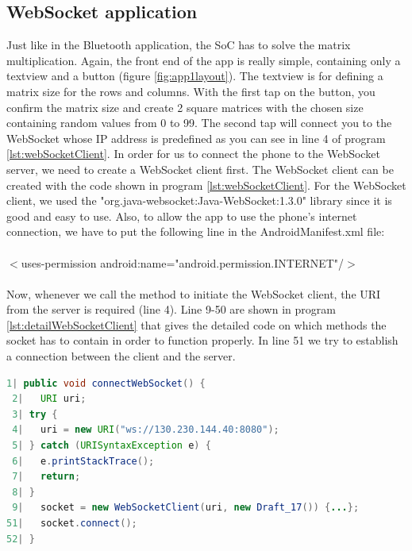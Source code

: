 \documentclass[a4paper, 11pt]{report}
\begin{document}
	\subsection{WebSocket application}\label{subsec:webapp}
Just like in the Bluetooth application, the SoC has to solve the matrix multiplication. Again, the front end of the app is really simple, containing only a textview and a button (figure \ref{fig:app1layout}). The textview is for defining a matrix size for the rows and columns. With the first tap on the button, you confirm the matrix size and create 2 square matrices with the chosen size containing random values from 0 to 99. The second tap will connect you to the WebSocket whose IP address is predefined as you can see in line 4 of program \ref{lst:webSocketClient}. In order for us to connect the phone to the WebSocket server, we need to create a WebSocket client first. The WebSocket client can be created with the code shown in program \ref{lst:webSocketClient}. For the WebSocket client, we used the "org.java-websocket:Java-WebSocket:1.3.0" library since it is good and easy to use. Also, to allow the app to use the phone's internet connection, we have to put the following line in the AndroidManifest.xml file:\\\\
\indent $<$uses-permission android:name="android.permission.INTERNET"/$>$
\\\\
Now, whenever we call the method to initiate the WebSocket client, the URI from the server is required (line 4).  Line 9-50 are shown in program \ref{lst:detailWebSocketClient} that gives the detailed code on which methods the socket has to contain in order to function properly. In line 51 we try to establish a connection between the client and the server.
\begin{lstlisting}[caption={Making a WebSocket client},captionpos=b, label={lst:webSocketClient}, language=java, float=h]
 1| public void connectWebSocket() {
 2|   URI uri;
 3| try {
 4|   uri = new URI("ws://130.230.144.40:8080");
 5| } catch (URISyntaxException e) {
 6|   e.printStackTrace();
 7|   return;
 8| }
 9|   socket = new WebSocketClient(uri, new Draft_17()) {...};
51|   socket.connect();
52| }
\end{lstlisting}\\
\end{document}
